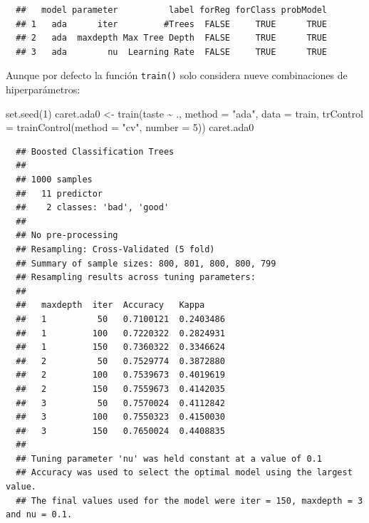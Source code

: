 \documentclass[
]{book}
\newenvironment{Shaded}{\begin{snugshade}}{\end{snugshade}}
\newcommand{\AttributeTok}[1]{\textcolor[rgb]{0.77,0.63,0.00}{#1}}
\newcommand{\DecValTok}[1]{\textcolor[rgb]{0.00,0.00,0.81}{#1}}
\newcommand{\FunctionTok}[1]{\textcolor[rgb]{0.00,0.00,0.00}{#1}}
\newcommand{\NormalTok}[1]{#1}
\newcommand{\OtherTok}[1]{\textcolor[rgb]{0.56,0.35,0.01}{#1}}
\newcommand{\SpecialCharTok}[1]{\textcolor[rgb]{0.00,0.00,0.00}{#1}}
\newcommand{\StringTok}[1]{\textcolor[rgb]{0.31,0.60,0.02}{#1}}
\theoremstyle{break}
\theoremstyle{nonumberplain}
\begin{document}
\begin{verbatim}
  ##   model parameter          label forReg forClass probModel
  ## 1   ada      iter         #Trees  FALSE     TRUE      TRUE
  ## 2   ada  maxdepth Max Tree Depth  FALSE     TRUE      TRUE
  ## 3   ada        nu  Learning Rate  FALSE     TRUE      TRUE
\end{verbatim}

Aunque por defecto la función \texttt{train()} solo considera nueve combinaciones de hiperparámetros:

\begin{Shaded}
\begin{Highlighting}[]
\FunctionTok{set.seed}\NormalTok{(}\DecValTok{1}\NormalTok{)}
\NormalTok{caret.ada0 }\OtherTok{\textless{}{-}} \FunctionTok{train}\NormalTok{(taste }\SpecialCharTok{\textasciitilde{}}\NormalTok{ ., }\AttributeTok{method =} \StringTok{"ada"}\NormalTok{, }\AttributeTok{data =}\NormalTok{ train,}
                   \AttributeTok{trControl =} \FunctionTok{trainControl}\NormalTok{(}\AttributeTok{method =} \StringTok{"cv"}\NormalTok{, }\AttributeTok{number =} \DecValTok{5}\NormalTok{))}
\NormalTok{caret.ada0}
\end{Highlighting}
\end{Shaded}

\begin{verbatim}
  ## Boosted Classification Trees 
  ## 
  ## 1000 samples
  ##   11 predictor
  ##    2 classes: 'bad', 'good' 
  ## 
  ## No pre-processing
  ## Resampling: Cross-Validated (5 fold) 
  ## Summary of sample sizes: 800, 801, 800, 800, 799 
  ## Resampling results across tuning parameters:
  ## 
  ##   maxdepth  iter  Accuracy   Kappa    
  ##   1          50   0.7100121  0.2403486
  ##   1         100   0.7220322  0.2824931
  ##   1         150   0.7360322  0.3346624
  ##   2          50   0.7529774  0.3872880
  ##   2         100   0.7539673  0.4019619
  ##   2         150   0.7559673  0.4142035
  ##   3          50   0.7570024  0.4112842
  ##   3         100   0.7550323  0.4150030
  ##   3         150   0.7650024  0.4408835
  ## 
  ## Tuning parameter 'nu' was held constant at a value of 0.1
  ## Accuracy was used to select the optimal model using the largest value.
  ## The final values used for the model were iter = 150, maxdepth = 3 and nu = 0.1.
\end{verbatim}

\begin{Shaded}
\end{Shaded}
\end{document}
